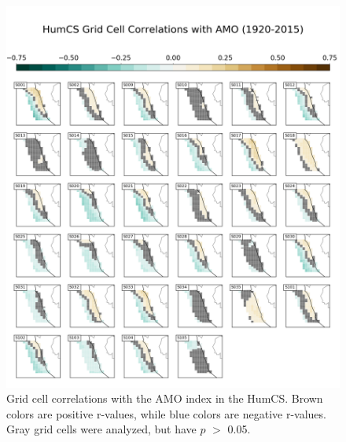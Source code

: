 \documentclass[12pt]{article}
\begin{document}
\begin{figure}[!h]
	\centering
	\includegraphics[width=\linewidth]{../../figs/humcs/spatial-correlations/humcs-grid-cell-correlations-amo-postage.png}
	\caption{Grid cell correlations with the AMO index in the HumCS. Brown colors are positive r-values, while blue colors are negative r-values. Gray grid cells were analyzed, but have $p$ $>$ 0.05.}
	\label{fig:HumCS-AMO-Spatial}
\end{figure}
\newpage
\end{document}

